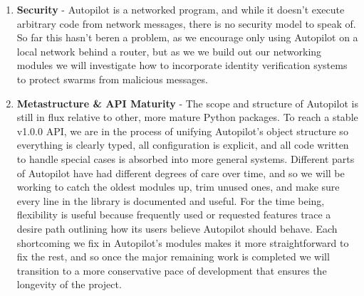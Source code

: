 \begin{enumerate}[ref=\thechapter.\arabic*]
    \item \label{future:security} \textbf{Security} - Autopilot is a networked program, and while it doesn't execute arbitrary code from network messages, there is no security model to speak of. So far this hasn't beren a problem, as we encourage only using Autopilot on a local network behind a router, but as we we build out our networking modules we will investigate how to incorporate identity verification systems to protect swarms from malicious messages.
    \item \label{future:metastructure}\textbf{Metastructure \& API Maturity} - The scope and structure of Autopilot is still in flux relative to other, more mature Python packages. To reach a stable v1.0.0 API, we are in the process of unifying Autopilot's object structure so everything is clearly typed, all configuration is explicit, and all code written to handle special cases is absorbed into more general systems. Different parts of Autopilot have had different degrees of care over time, and so we will be working to catch the oldest modules up, trim unused ones, and make sure every line in the library is documented and useful. For the time being, flexibility is useful because frequently used or requested features trace a desire path outlining how its users believe Autopilot should behave. Each shortcoming we fix in Autopilot's modules makes it more straightforward to fix the rest, and so once the major remaining work is completed we will transition to a more conservative pace of development that ensures the longevity of the project.
\end{enumerate}
